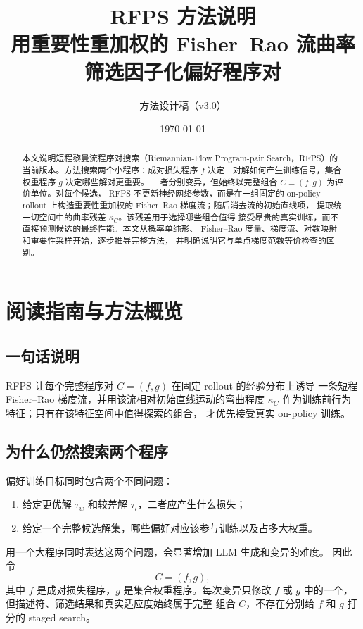 \documentclass[UTF8,11pt]{ctexart}
\title{\textbf{RFPS 方法说明}\\
\large 用重要性重加权的 Fisher--Rao 流曲率筛选因子化偏好程序对}
\author{方法设计稿（v3.0）}
\date{\today}
\newcommand{\RFPS}{\textsc{RFPS}}
\begin{document}
\maketitle

\begin{abstract}
本文说明短程黎曼流程序对搜索（Riemannian-Flow Program-pair
Search，\RFPS）的当前版本。方法搜索两个小程序：成对损失程序 \(f\)
决定一对解如何产生训练信号，集合权重程序 \(g\) 决定哪些解对更重要。
二者分别变异，但始终以完整组合 \(C=(f,g)\) 为评价单位。对每个候选，
\RFPS{} 不更新神经网络参数，而是在一组固定的 on-policy rollout
上构造重要性重加权的 Fisher--Rao 梯度流；随后消去流的初始直线项，
提取统一切空间中的曲率残差 \(\kappa_C\)。该残差用于选择哪些组合值得
接受昂贵的真实训练，而不直接预测候选的最终性能。本文从概率单纯形、
Fisher--Rao 度量、梯度流、对数映射和重要性采样开始，逐步推导完整方法，
并明确说明它与单点梯度范数等价检查的区别。
\end{abstract}

\tableofcontents

\section{阅读指南与方法概览}

\subsection{一句话说明}

\RFPS{} 让每个完整程序对 \(C=(f,g)\) 在固定 rollout 的经验分布上诱导
一条短程 Fisher--Rao 梯度流，并用该流相对初始直线运动的弯曲程度
\(\kappa_C\) 作为训练前行为特征；只有在该特征空间中值得探索的组合，
才优先接受真实 on-policy 训练。

\subsection{为什么仍然搜索两个程序}

偏好训练目标同时包含两个不同问题：
\begin{enumerate}
    \item 给定更优解 \(\tau_w\) 和较差解 \(\tau_l\)，二者应产生什么损失；
    \item 给定一个完整候选解集，哪些偏好对应该参与训练以及占多大权重。
\end{enumerate}
用一个大程序同时表达这两个问题，会显著增加 LLM 生成和变异的难度。
因此令
\[
    C=(f,g),
\]
其中 \(f\) 是成对损失程序，\(g\) 是集合权重程序。每次变异只修改
\(f\) 或 \(g\) 中的一个，但描述符、筛选结果和真实适应度始终属于完整
组合 \(C\)，不存在分别给 \(f\) 和 \(g\) 打分的 staged search。
\end{document}
